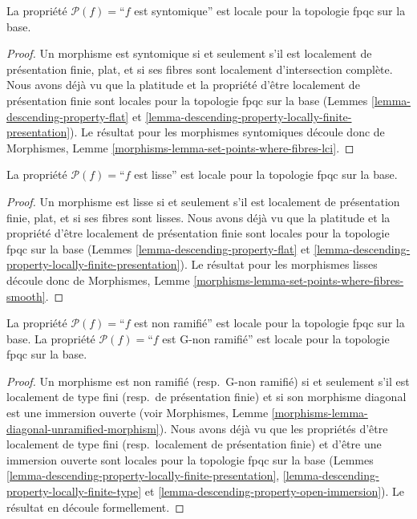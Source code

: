 \begin{lemma}
\label{lemma-descending-property-syntomic}
La propriété $\mathcal{P}(f) =$``$f$ est syntomique''
est locale pour la topologie fpqc sur la base.
\end{lemma}

\begin{proof}
Un morphisme est syntomique si et seulement s'il est localement de présentation
finie, plat, et si ses fibres sont localement d'intersection complète.
Nous avons déjà vu que la platitude et la propriété d'être localement de
présentation finie sont locales pour la topologie fpqc sur la base (Lemmes
\ref{lemma-descending-property-flat} et
\ref{lemma-descending-property-locally-finite-presentation}).
Le résultat pour les morphismes syntomiques découle donc de
Morphismes, Lemme \ref{morphisms-lemma-set-points-where-fibres-lci}.
\end{proof}

\begin{lemma}
\label{lemma-descending-property-smooth}
La propriété $\mathcal{P}(f) =$``$f$ est lisse''
est locale pour la topologie fpqc sur la base.
\end{lemma}

\begin{proof}
Un morphisme est lisse si et seulement s'il est localement de présentation
finie, plat, et si ses fibres sont lisses. Nous avons déjà vu que la platitude
et la propriété d'être localement de présentation finie sont locales pour la
topologie fpqc sur la base (Lemmes
\ref{lemma-descending-property-flat} et
\ref{lemma-descending-property-locally-finite-presentation}).
Le résultat pour les morphismes lisses découle donc de
Morphismes, Lemme \ref{morphisms-lemma-set-points-where-fibres-smooth}.
\end{proof}

\begin{lemma}
\label{lemma-descending-property-unramified}
La propriété $\mathcal{P}(f) =$``$f$ est non ramifié''
est locale pour la topologie fpqc sur la base.
La propriété $\mathcal{P}(f) =$``$f$ est G-non ramifié''
est locale pour la topologie fpqc sur la base.
\end{lemma}

\begin{proof}
Un morphisme est non ramifié (resp.\ G-non ramifié) si et seulement s'il est
localement de type fini (resp.\ de présentation finie)
et si son morphisme diagonal est une immersion ouverte (voir
Morphismes, Lemme \ref{morphisms-lemma-diagonal-unramified-morphism}).
Nous avons déjà vu que les propriétés d'être localement de type fini
(resp.\ localement de présentation finie) et d'être une immersion ouverte sont
locales pour la topologie fpqc sur la base (Lemmes
\ref{lemma-descending-property-locally-finite-presentation},
\ref{lemma-descending-property-locally-finite-type} et
\ref{lemma-descending-property-open-immersion}).
Le résultat en découle formellement.
\end{proof}

